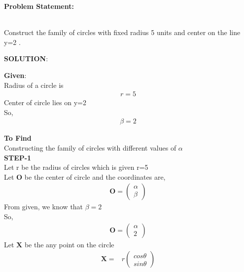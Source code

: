 \documentclass[10pt,a4paper]{report}
\newcommand{\myvec}[1]{\ensuremath{\begin{pmatrix}#1\end{pmatrix}}}
\let\vec\mathbf
\let\vec\mathbf
\begin{document}
\begin{multicols}{2}

\raggedright \textbf{Problem Statement:}\vspace{2mm}
\raggedright \\Construct the family of circles with fixed radius 5 units and center on the line y=2  .\\
\vspace{5mm}
\raggedright \textbf{SOLUTION}:\vspace{2mm}\\

\raggedright \textbf{Given}:\vspace{2mm}\\
Radius of a circle is \\\vspace{1mm}
\begin{align}
r = 5 
\end{align}
Center of circle lies on y=2\\ \vspace{1mm}
So,\\
\begin{align}
\beta=2
\end{align}

\textbf{To Find }\vspace{2mm}\\
Constructing the family of circles with different values of $\alpha$ \vspace{2mm}  \\ 
\textbf{STEP-1}\vspace{2mm}\\
Let r be the radius of circles which is given r=5 \\ \vspace{1mm}
Let $\vec{O}$ be the center of circle and the coordinates are,\vspace{1mm}
\begin{align}
\vec{O}=\myvec{
\alpha\\
\beta
}
\end{align} \vspace{2mm}
From given, we know that $\beta=2$ \\
So,\\
\begin{align}
\vec{O}=\myvec{
\alpha\\
2
}
\end{align} \vspace{2mm}
Let $\vec{X}$ be the any point on the circle \\\vspace{1mm}
\begin{align}
    \vec{X} = &r \myvec{
    cos\theta\\
    sin\theta
    }
\end{align}


\end{multicols}
\end{document}
